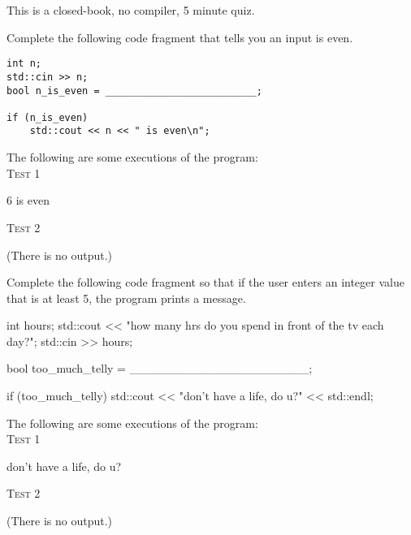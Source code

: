 

This is a closed-book, no compiler, 5 minute quiz.

\nextq
Complete the following code fragment
that tells you an input is even.
\begin{Verbatim}[frame=single,fontsize=\footnotesize]
int n;
std::cin >> n;
bool n_is_even = __________________________;

if (n_is_even)
    std::cout << n << " is even\n";
    \end{Verbatim}
The following are some executions of the program:
\\
\textsc{Test 1}
\begin{console}[commandchars=\\\{\},fontsize=\small]
6 is even
\end{console}
\textsc{Test 2}
\begin{console}[commandchars=\\\{\},fontsize=\small]
\end{console}
(There is no output.)
\\
\ANSWER
\begin{answercode}

\end{answercode}

\newpage
\nextq
Complete the following code fragment
so that if the user enters an integer value that is at least 5,
the program prints a message.
\begin{console}[commandchars=\\\{\},fontsize=\small]
int hours;
std::cout << "how many hrs do you spend in front of the tv each day?";
std::cin >> hours;

bool too_much_telly = _____________________;

if (too_much_telly)
    std::cout << "don't have a life, do u?" << std::endl;
\end{console}
The following are some executions of the program:
\\
\textsc{Test 1}
\begin{console}[commandchars=\\\{\},fontsize=\small]
don't have a life, do u?
\end{console}
\textsc{Test 2}
\begin{console}[commandchars=\\\{\},fontsize=\small]
\end{console}
(There is no output.)
\\
\ANSWER
\begin{answercode}

\end{answercode}

